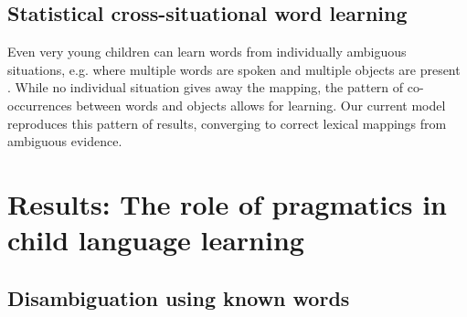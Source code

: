 \documentclass{article} %
\begin{document}
\subsection{Statistical cross-situational word learning}

Even very young children can learn words from individually ambiguous situations, e.g. where multiple words are spoken and multiple objects are present \cite{smith2008}. While no individual situation gives away the mapping, the pattern of co-occurrences between words and objects allows for learning. Our current model reproduces this pattern of results, converging to correct lexical mappings from ambiguous evidence. 



\section{Results: The role of pragmatics in child language learning}

\subsection{Disambiguation using known words}
\end{document}
